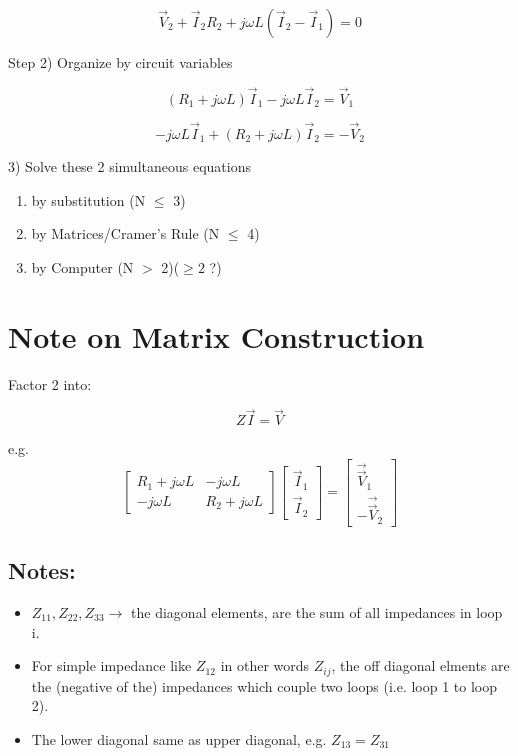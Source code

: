 \[\vec V_2 + \vec{I}_2 R_2 + j\omega L(\vec{I}_2 - \vec{I}_1) = 0\]

Step 2) Organize by circuit variables

\[(R_1 + j\omega L)\vec{I}_1 - j\omega L\vec{I}_2 = \vec V_1\]

\[-j\omega L\vec{I}_1 + (R_2 + j\omega L)\vec{I}_2 = -\vec V_2\]

3) Solve these 2 simultaneous equations
   \begin{enumerate}
   \item by substitution (N $\leq$ 3)
   \item by Matrices/Cramer's Rule (N $\leq$ 4)
   \item by Computer (N $>$ 2)($\geq 2$ ?)
   \end{enumerate}

\section*{Note on Matrix Construction}

Factor 2 into:

\[
{Z}{\vec{I}} = \vec{V}\]

e.g.
\[\begin{bmatrix}
R_1 + j\omega L & -j\omega L \\
-j\omega L & R_2 + j\omega L
\end{bmatrix}
\begin{bmatrix}
\vec{I}_1 \\
\vec{I}_2
\end{bmatrix}
=
\begin{bmatrix}
\vec \vec V_1 \\
-\vec \vec V_2
\end{bmatrix}\]

\subsection*{Notes:}
\begin{itemize}
\item $Z_{11}, Z_{22}, Z_{33} \rightarrow$ the diagonal elements, are the sum of all impedances in loop i.
\item For simple impedance like $ Z_{12} $ in other words $Z_{ij}$, the off diagonal
elments are the (negative of the) impedances which couple two loops (i.e. loop 1 to loop 2).
\item  The lower diagonal same as upper  diagonal, e.g. $Z_{13} = Z_{31}$
\end{itemize}

